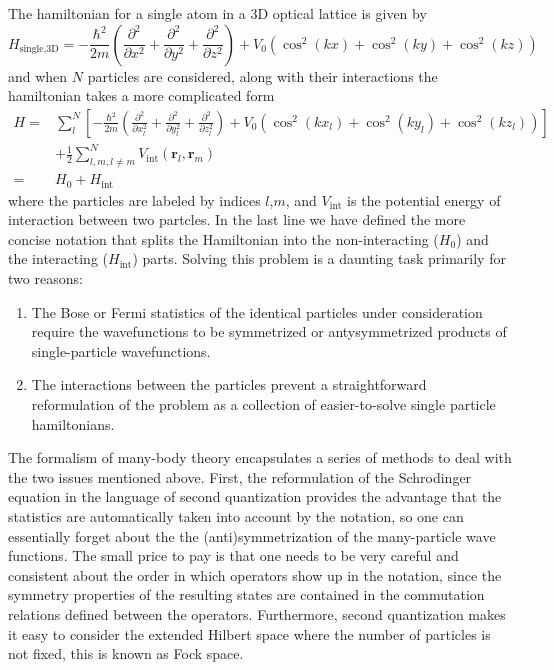 \documentclass[oneside,11pt]{memoir}
\newcommand{\bv}[1]{\ensuremath{\bm{#1}}}
\newcommand{\vo}{\ensuremath{V_{0}}}
\begin{document}
The hamiltonian for a single atom in a 3D optical lattice is given by  
\begin{equation}
  H_{\text{single,3D}} = - \frac{\hbar^{2}}{2m} \left( \frac{\partial^{2}}{\partial x^{2}}
                            + \frac{\partial^{2}}{\partial y^{2}}
                            + \frac{\partial^{2}}{\partial z^{2}} \right)
 + \vo\left( \cos^{2}(kx)  + \cos^{2}(ky) + \cos^{2}(kz) \right)
\end{equation}
and when $N$ particles are considered, along with their interactions the
hamiltonian takes a more complicated form \begin{equation}
\begin{split}
  H = & \sum_{l}^{N}\left[ -\frac{\hbar^{2}}{2m} \left( \frac{\partial^{2}}{\partial x_{l}^{2}}
                            + \frac{\partial^{2}}{\partial y_{l}^{2}}
                            + \frac{\partial^{2}}{\partial z_{l}^{2}} \right)
 + \vo\left( \cos^{2}(kx_{l})  + \cos^{2}(ky_{l}) + \cos^{2}(kz_{l}) \right) \right]\\
      &  + \frac{1}{2}\sum_{ l,m, l\neq m}^{N} V_{\mathrm{int}}(\bv{r}_{l},\bv{r}_{m} )\\ 
    = & H_{0} + H_{\text{int}}
 \label{eq:hubbard1st}
\end{split} 
\end{equation} 
where the particles are labeled by indices $l$,$m$, and $V_{\mathrm{int}}$ is
the potential energy of interaction between two partcles.  In the last line we
have defined the more concise notation that splits the Hamiltonian into the
non-interacting ($H_{0}$) and the interacting ($H_{\text{int}}$) parts. Solving
this problem is a daunting task primarily for two reasons:
\begin{enumerate}
    \item The Bose or Fermi statistics of the identical particles under
consideration require the wavefunctions to be symmetrized or antysymmetrized
products of single-particle wavefunctions.     
    \item The interactions between the particles prevent a straightforward
reformulation of the problem as a collection of easier-to-solve single particle
hamiltonians.  
\end{enumerate}

The formalism of many-body theory encapsulates a series of methods to deal with
the two issues mentioned above.   First, the reformulation of the Schrodinger
equation in the language of second quantization provides the advantage that the
statistics are automatically taken into account by the notation, so one can
essentially forget about the the (anti)symmetrization of the many-particle wave
functions.  The small price to pay is that one needs to be very careful and
consistent about the order in which operators show up in the notation, since
the symmetry properties of the resulting states are contained in the
commutation relations defined between the operators.  Furthermore, second
quantization makes it easy to consider the extended Hilbert space where the
number of particles is not fixed, this is known as Fock space. 
\end{document}
